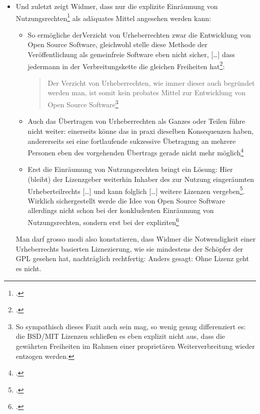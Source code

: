 \documentclass[DIV=calc,BCOR=5mm,11pt,headings=small,oneside,abstract=true, toc=bib]{scrartcl}
\begin{document}
\begin{itemize}
  einräumen\grqq{}\footcite[vgl.][98]{Widmer2003a}.
  \item Und zuletzt zeigt Widmer, dass nur die \glqq{}explizite
  Einräumung von Nutzungsrechten\grqq{}\footcite[vgl.][100]{Widmer2003a} als
  adäquates Mittel angesehen werden kann:
  \begin{itemize}
    \item So ermögliche der\glqq{}Verzicht von Urheberrechten\grqq{} zwar
    \glqq{}die Entwicklung von Open Source Software\grqq{}, gleichwohl stelle
    diese Methode der Veröffentlichung als \glqq{}gemeinfreie Software
    \grqq{}eben nicht sicher, \glqq{}[\ldots] dass jedermann in der
    Verbreitungskette die gleichen Freiheiten
    hat\grqq{}\footcite[vgl.][98]{Widmer2003a}: 
    \begin{quote} \glqq{}Der
    Verzicht von Urheberrechten, wie immer dieser auch begründet werden man, ist
    somit kein probates Mittel zur Entwicklung von Open Source
    Software\grqq{}\footnote{\cite[][98f]{Widmer2003a} So sympathisch dieses
    Fazit auch sein mag, so wenig genug differenziert es: die BSD/MIT Lizenzen
    schließen es eben explizit nicht aus, dass die gewährten Freiheiten im
    Rahmen einer proprietären Weiterverbreitung wieder entzogen werden.}
    \end{quote}
    \item Auch das \glqq{}Übertragen von Urheberrechten als Ganzes oder
    Teilen\grqq{} führe nicht weiter: einerseits könne das in praxi dieselben
    Konsequenzen haben, andererseits sei eine fortlaufende sukzessive Übetragung
    an mehrere Personen eben des vorgehenden Übertrags gerade nicht mehr
    möglich\footcite[vgl.][99]{Widmer2003a}
    \item Erst die \glqq{}Einräumung von Nutzungsrechten\grqq{} bringt ein
    Lösung: Hier \glqq{}(bleibt) der Lizenzgeber weiterhin Inhaber des
    zur Nutzung eingeräumten Urheberteilrechts [\ldots]\grqq{} und kann folglich
    \glqq{}[\ldots] weitere Lizenzen
    vergeben\grqq{}\footcite[vgl.][99f]{Widmer2003a}. Wirklich sichergestellt
    werde die Idee von Open Source Software allerdings nicht schon bei der
    \glqq{}konkludenten Einräumung von Nutzungsrechten\grqq{}, sondern erst bei
    der \glqq{}expliziten\grqq{}\footcite[vgl.][100]{Widmer2003a}
\end{itemize}
   
Man darf grosso modi also konstatieren, dass Widmer die Notwendigkeit einer
Urheberrechts basierten Liznezierung, wie sie mindestens der Schöpfer der GPL
gesehen hat, nachträglich rechtfertig: Anders gesagt: Ohne  Lizenz geht es nicht.
\end{itemize}
\end{document}
